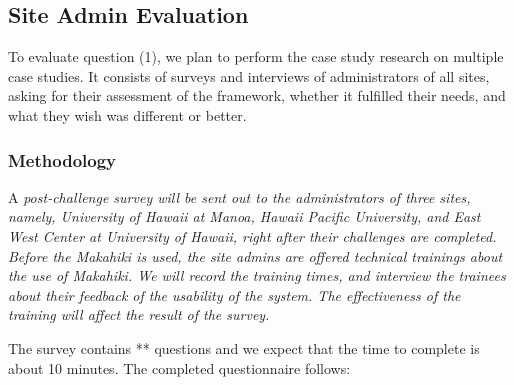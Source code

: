 \documentclass[11pt]{article}
\begin{document}
\subsection{Site Admin Evaluation}
To evaluate question (1), we plan to perform the case study research on multiple case studies. It consists of surveys and interviews of administrators of all sites, asking for their assessment of the framework, whether it fulfilled their needs, and what they wish was different or better. 

\subsubsection{Methodology}

A \em post-challenge survey \em will be sent out to the administrators of three sites, namely, University of Hawaii at Manoa, Hawaii Pacific University, and East West Center at University of Hawaii, right after their challenges are completed. Before the Makahiki is used, the site admins are offered technical trainings about the use of Makahiki. We will record the training times, and interview the trainees about their feedback of the usability of the system. The effectiveness of the training will affect the result of the survey.

The survey contains ** questions and we expect that the time to complete is about 10 minutes. The completed questionnaire follows:
\end{document}
